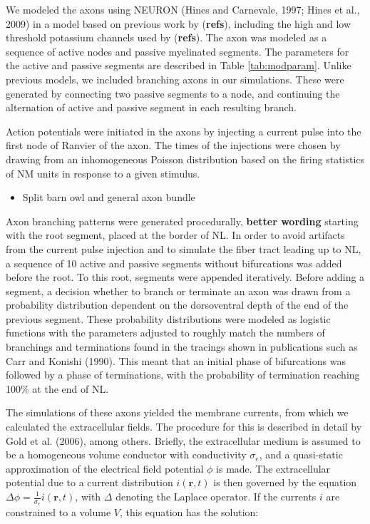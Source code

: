 \documentclass[]{article}
\providecommand{\tightlist}{%
  \setlength{\itemsep}{0pt}\setlength{\parskip}{0pt}}
\begin{document}
We modeled the axons using NEURON (Hines and Carnevale, 1997; Hines et
al., 2009) in a model based on previous work by (\textbf{refs}),
including the high and low threshold potassium channels used by
(\textbf{refs}). The axon was modeled as a sequence of active nodes and
passive myelinated segments. The parameters for the active and passive
segments are described in Table \ref{tab:modparam}. Unlike previous
models, we included branching axons in our simulations. These were
generated by connecting two passive segments to a node, and continuing
the alternation of active and passive segment in each resulting branch.

Action potentials were initiated in the axons by injecting a current
pulse into the first node of Ranvier of the axon. The times of the
injections were chosen by drawing from an inhomogeneous Poisson
distribution based on the firing statistics of NM units in response to a
given stimulus.

\begin{itemize}
\tightlist
\item
  Split barn owl and general axon bundle
\end{itemize}

Axon branching patterns were generated procedurally, \textbf{better
wording} starting with the root segment, placed at the border of NL. In
order to avoid artifacts from the current pulse injection and to
simulate the fiber tract leading up to NL, a sequence of 10 active and
passive segments without bifurcations was added before the root. To this
root, segments were appended iteratively. Before adding a segment, a
decision whether to branch or terminate an axon was drawn from a
probability distribution dependent on the dorsoventral depth of the end
of the previous segment. These probability distributions were modeled as
logistic functions with the parameters adjusted to roughly match the
numbers of branchings and terminations found in the tracings shown in
publications such as Carr and Konishi (1990). This meant that an initial
phase of bifurcations was followed by a phase of terminations, with the
probability of termination reaching 100\% at the end of NL.

The simulations of these axons yielded the membrane currents, from which
we calculated the extracellular fields. The procedure for this is
described in detail by Gold et al. (2006), among others. Briefly, the
extracellular medium is assumed to be a homogeneous volume conductor
with conductivity \(\sigma_e\), and a quasi-static approximation of the
electrical field potential \(\phi\) is made. The extracellular potential
due to a current distribution \(i(\mathbf{r},t)\) is then governed by
the equation \(\Delta \phi = \frac{1}{\sigma_e} i(\mathbf{r},t)\), with
\(\Delta\) denoting the Laplace operator. If the currents \(i\) are
constrained to a volume \(V\), this equation has the solution:
\end{document}
